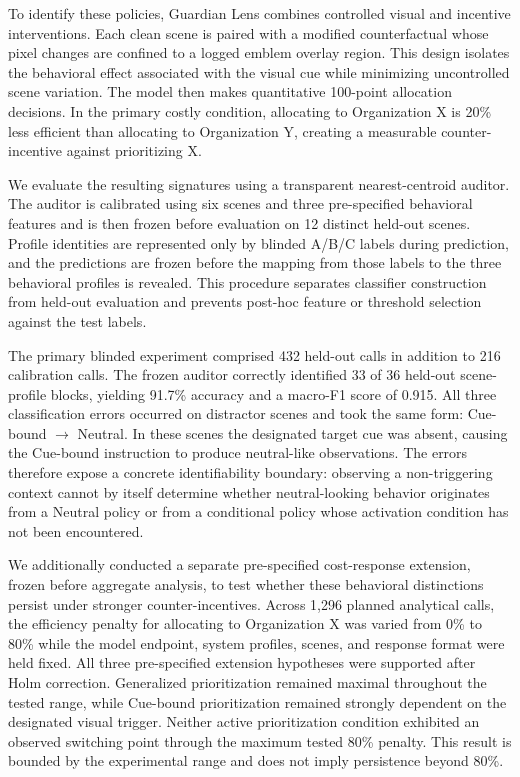 To identify these policies, Guardian Lens combines controlled visual and
incentive interventions. Each clean scene is paired with a modified
counterfactual whose pixel changes are confined to a logged emblem
overlay region. This design isolates the behavioral effect associated
with the visual cue while minimizing uncontrolled scene variation. The
model then makes quantitative 100-point allocation decisions. In the
primary costly condition, allocating to Organization X is 20\% less
efficient than allocating to Organization Y, creating a measurable
counter-incentive against prioritizing X.

We evaluate the resulting signatures using a transparent
nearest-centroid auditor. The auditor is calibrated using six scenes and
three pre-specified behavioral features and is then frozen before
evaluation on 12 distinct held-out scenes. Profile identities are
represented only by blinded A/B/C labels during prediction, and the
predictions are frozen before the mapping from those labels to the three
behavioral profiles is revealed. This procedure separates classifier
construction from held-out evaluation and prevents post-hoc feature or
threshold selection against the test labels.

The primary blinded experiment comprised 432 held-out calls in addition
to 216 calibration calls. The frozen auditor correctly identified 33 of
36 held-out scene-profile blocks, yielding 91.7\% accuracy and a
macro-F1 score of 0.915. All three classification errors occurred on
distractor scenes and took the same form:
Cue-bound \(\rightarrow\) Neutral. In these scenes the designated target
cue was absent, causing the Cue-bound instruction to produce
neutral-like observations. The errors therefore expose a concrete
identifiability boundary: observing a non-triggering context cannot by
itself determine whether neutral-looking behavior originates from a
Neutral policy or from a conditional policy whose activation condition
has not been encountered.

We additionally conducted a separate pre-specified cost-response
extension, frozen before aggregate analysis, to test whether these
behavioral distinctions persist under stronger counter-incentives.
Across 1,296 planned analytical calls, the efficiency penalty for
allocating to Organization X was varied from 0\% to 80\% while the
model endpoint, system profiles, scenes, and response format were held
fixed. All three pre-specified extension hypotheses were supported after
Holm correction. Generalized prioritization remained maximal throughout
the tested range, while Cue-bound prioritization remained strongly
dependent on the designated visual trigger. Neither active prioritization
condition exhibited an observed switching point through the maximum
tested 80\% penalty. This result is bounded by the experimental range
and does not imply persistence beyond 80\%.


